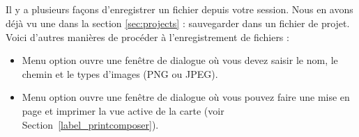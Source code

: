 
\subsection{}\label{sec:output}
Il y a plusieurs fa\c{c}ons d'enregistrer un fichier depuis votre session. Nous en avons d\'ej\`a vu une dans la section \ref{sec:projects} : sauvegarder dans un fichier de projet.
Voici d'autres mani\`eres de proc\'eder \`a l'enregistrement de fichiers :
\begin{itemize}
\item Menu option  ouvre une fen\^etre de dialogue o\`u vous devez saisir le nom, le chemin et le types d'images (PNG ou JPEG).
\item Menu option  ouvre une fen\^etre de dialogue o\`u vous pouvez faire une mise en page et imprimer la vue active de la carte (voir Section~\ref{label_printcomposer}).
\end{itemize}


